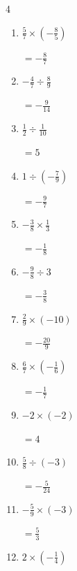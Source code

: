 \begin{multicols}{4}
\begin{enumerate}
        $\displaystyle =-\frac{3}{2}$

  \item $\displaystyle \frac{5}{7}\times{}\left(-\frac{8}{5}\right)$

        $\displaystyle =-\frac{8}{7}$

  \item $\displaystyle -\frac{4}{7}\div{}\frac{8}{9}$

        $\displaystyle =-\frac{9}{14}$

  \item $\displaystyle \frac{1}{2}\div{}\frac{1}{10}$

        $\displaystyle =5$

  \item $\displaystyle 1\div{}\left(-\frac{7}{9}\right)$

        $\displaystyle =-\frac{9}{7}$

  \item $\displaystyle -\frac{3}{8}\times{}\frac{1}{3}$

        $\displaystyle =-\frac{1}{8}$

  \item $\displaystyle -\frac{9}{8}\div{}3$

        $\displaystyle =-\frac{3}{8}$

  \item $\displaystyle \frac{2}{9}\times{}\left(-10\right)$

        $\displaystyle =-\frac{20}{9}$

  \item $\displaystyle \frac{6}{7}\times{}\left(-\frac{1}{6}\right)$

        $\displaystyle =-\frac{1}{7}$

\columnbreak %

  \item $\displaystyle -2\times{}\left(-2\right)$

        $\displaystyle =4$

  \item $\displaystyle \frac{5}{8}\div{}\left(-3\right)$

        $\displaystyle =-\frac{5}{24}$

  \item $\displaystyle -\frac{5}{9}\times{}\left(-3\right)$

        $\displaystyle =\frac{5}{3}$

  \item $\displaystyle 2\times{}\left(-\frac{1}{4}\right)$


\end{enumerate}
\end{multicols}
